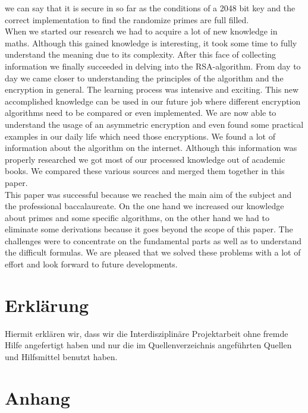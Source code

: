 we can say that it is secure in so far as the conditions of a 2048 bit key and the correct implementation to find the randomize primes are full filled. \\
When we started our research we had to acquire a lot of new knowledge in maths. Although this gained knowledge is interesting, it took some time to fully understand the meaning due to its complexity. After this face of collecting information we finally succeeded in delving into the RSA-algorithm. %
From day to day we came closer to understanding the principles of the algorithm and the encryption in general. The learning process was intensive and exciting. This new accomplished knowledge can be used in our future job where different encryption algorithms need to be compared or even implemented. We are now able to understand the usage of an asymmetric encryption and even found some practical examples in our daily life which need those encryptions.  
We found a lot of information about the algorithm on the internet. Although this information was properly researched we got most of our processed knowledge out of academic books. We compared these various sources and merged them together in this paper.\\
This paper was successful because we reached the main aim of the subject and the professional baccalaureate. On the one hand we increased our knowledge about primes and some specific algorithms, on the other hand we had to eliminate some derivations  %
because it goes beyond the scope of this paper. The challenges were to concentrate on the fundamental parts as well as to understand the difficult formulas. We are pleased that we solved these problems with a lot of effort and look forward to future developments. 
\newpage
\section{Erklärung}
Hiermit erklären wir, dass wir die Interdisziplinäre Projektarbeit ohne fremde Hilfe angefertigt haben und nur die im Quellenverzeichnis angeführten Quellen und Hilfsmittel benutzt haben.
\newpage
\section{Anhang}
\listoffigures
\listoftables
%

